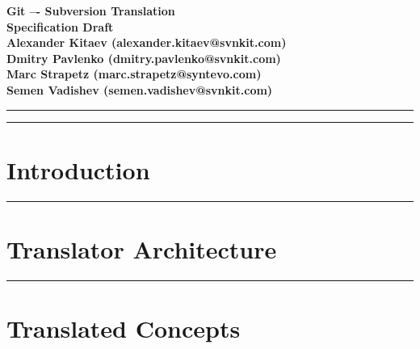 \documentclass[aps,%
12pt,%
final,%
oneside,
onecolumn,%
superscriptaddress,%
centertags]{article} %
\begin{document}
\begin{titlepage}
\begin{center}

\textbf{\LARGE Git –- Subversion Translation} \\[2.0cm]
\textbf{\Large Specification Draft} \\[3.0cm]

\textbf{Alexander Kitaev (alexander.kitaev@svnkit.com)} \\[0.7cm]
\textbf{Dmitry Pavlenko (dmitry.pavlenko@svnkit.com)} \\[0.7cm]
\textbf{Marc Strapetz (marc.strapetz@syntevo.com)} \\[0.7cm]
\textbf{Semen Vadishev (semen.vadishev@svnkit.com)} \\[0.7cm]

\end{center}
\end{titlepage}

\topmargin=-10pt
\setcounter{page}{2}

\newpage
\hrule
\tableofcontents

\newpage
\hrule
\section{Introduction}


\newpage
\hrule
\section{Translator Architecture}






\newpage
\hrule
\section{Translated Concepts}







\end{document}
